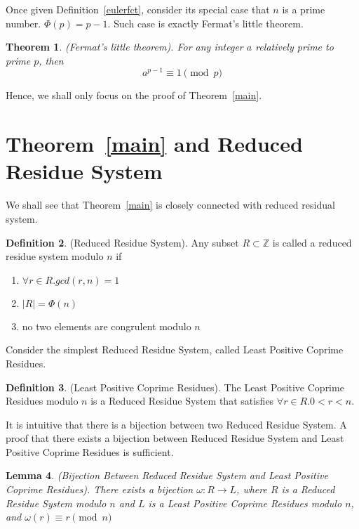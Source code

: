 \documentclass[12pt,a4paper]{amsart}
\numberwithin{equation}{section}
\theoremstyle{plain}
\newtheorem{Th}{Theorem}[section]
\newtheorem{Lemma}[Th]{Lemma}
\theoremstyle{definition}
\newtheorem{Def}[Th]{Definition}
\begin{document}
Once given Definition~\ref{eulerfct}, consider its special case
that $n$ is a prime number. $\Phi(p) = p - 1$. Such case
is exactly Fermat's little theorem.

\begin{Th} \label{fermatlitte} (Fermat's little theorem).\cite{basicdef} For any integer $a$ relatively prime to prime $p$, then
    $$ a^{p - 1} \equiv 1 \pmod p $$
\end{Th}

Hence, we shall only focus on the proof of Theorem~\ref{main}.

\section{Theorem~\ref{main} and Reduced Residue System} We shall see that
Theorem~\ref{main} is closely connected with reduced residual
system.

\begin{Def} \label{rrs} (Reduced Residue System). Any subset $ R \subset \mathbb{Z}$ is called
    a reduced residue system modulo $n$ if
    \begin{enumerate}
        \item $\forall r \in R. gcd(r, n) = 1$
        \item $\left\vert{R}\right\vert = \Phi(n)$
        \item no two elements are congrulent modulo $n$
    \end{enumerate}
\end{Def}

Consider the simplest Reduced Residue System, called Least Positive Coprime Residues.

\begin{Def} \label{lpcr} (Least Positive Coprime Residues). The Least Positive Coprime
    Residues modulo $n$ is a Reduced Residue System that satisfies $\forall r \in R. 0 < r < n$.
\end{Def}

It is intuitive that there is a bijection between two Reduced Residue System. A proof that
there exists a bijection between Reduced Residue System and Least Positive Coprime Residues
is sufficient.

\begin{Lemma} \label{bijection} (Bijection Between Reduced Residue System and Least Positive Coprime Residues). 
    There exists a bijection $\omega: R \to L$, where $R$ is a Reduced Residue System modulo $n$ and $L$ is a
    Least Positive Coprime Residues modulo $n$, and $\omega(r) \equiv r \pmod n$
\end{Lemma}
\end{document}
